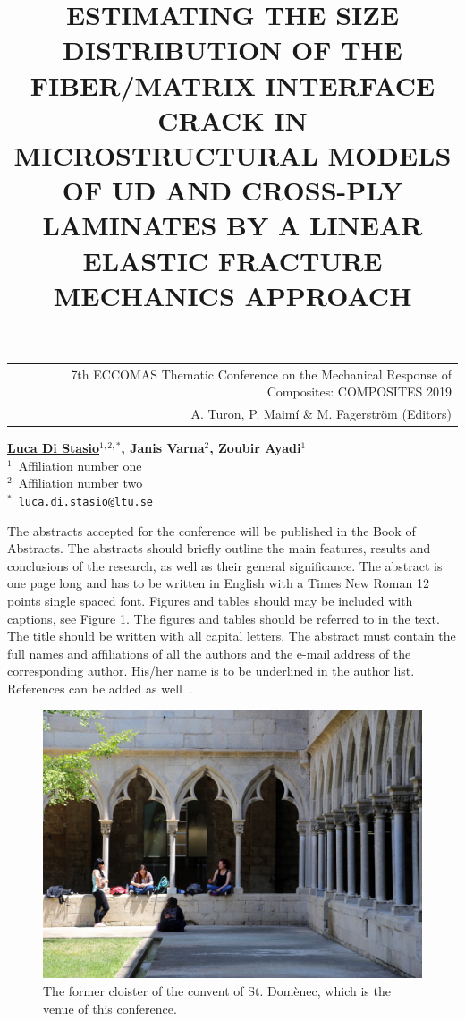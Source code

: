 \documentclass[12pt,a4paper]{article}
\begin{document}
\thispagestyle{empty}

\vspace*{-3.4cm}
\begin{table}[!h]
\begin{tabular}{r}
\hspace*{2.9cm} \scriptsize \textsf{7th ECCOMAS Thematic Conference on the Mechanical Response of Composites: COMPOSITES 2019} \\
\hspace*{2.9cm} \tiny \textsf{A. Turon, P. Maimí \& M. Fagerström (Editors)}
\end{tabular}
\end{table}

\vspace*{-0.7cm}

\begin{center}
\title{ESTIMATING THE SIZE DISTRIBUTION OF THE FIBER/MATRIX INTERFACE CRACK IN MICROSTRUCTURAL MODELS OF UD AND CROSS-PLY LAMINATES BY A LINEAR ELASTIC FRACTURE MECHANICS APPROACH}
\end{center}
\begin{center}
\textbf{\underline{Luca Di Stasio}$^{1,2,*}$, Janis Varna$^{2}$, Zoubir Ayadi$^{1}$} \\ [7pt]
\small{$^1$~Affiliation number one}  \\  [2pt]
\small{$^2$~Affiliation number two}  \\  [2pt]
\small{$^*$~\texttt{luca.di.stasio@ltu.se}} \\
\end{center}

\noindent
The abstracts accepted for the conference will be published in the Book of Abstracts. The abstracts should briefly outline the main features, results and conclusions of the research, as well as their general significance. The abstract is one page long and has to be written in English with a Times New Roman 12 points single spaced font. Figures and tables should may be included with captions, see Figure \ref{fig:Claustre}. The figures and tables should be referred to in the text. The title should be written with all capital letters. The abstract must contain the full names and affiliations of all the authors and the e-mail address of the corresponding author. His/her name is to be underlined in the author list. References can be added as well~\cite{Barbero,Pimenta}.

\begin{figure}[h]
\centering\includegraphics[width=0.55\linewidth]{Claustre.pdf}
\caption{The former cloister of the convent of St. Domènec, which is the venue of this conference.}
\label{fig:Claustre}
\end{figure}
\end{document}
